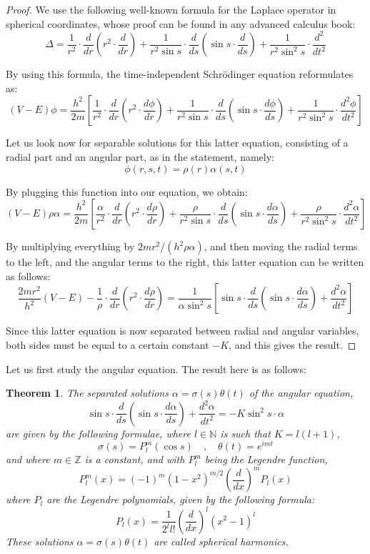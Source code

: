 \documentclass[12pt]{amsbook}
\newtheorem{theorem}{Theorem}[chapter]
\begin{document}
\begin{proof}
We use the following well-known formula for the Laplace operator in spherical coordinates, whose proof can be found in any advanced calculus book:
$$\Delta=\frac{1}{r^2}\cdot\frac{d}{dr}\left(r^2\cdot\frac{d}{dr}\right)
+\frac{1}{r^2\sin s}\cdot\frac{d}{ds}\left(\sin s\cdot\frac{d}{ds}\right)
+\frac{1}{r^2\sin^2s}\cdot\frac{d^2}{dt^2}$$

By using this formula, the time-independent Schr\"odinger equation reformulates as:
$$(V-E)\phi=\frac{h^2}{2m}\left[\frac{1}{r^2}\cdot\frac{d}{dr}\left(r^2\cdot\frac{d\phi}{dr}\right)
+\frac{1}{r^2\sin s}\cdot\frac{d}{ds}\left(\sin s\cdot\frac{d\phi}{ds}\right)
+\frac{1}{r^2\sin^2s}\cdot\frac{d^2\phi}{dt^2}\right]$$

Let us look now for separable solutions for this latter equation, consisting of a radial part and an angular part, as in the statement, namely:
$$\phi(r,s,t)=\rho(r)\alpha(s,t)$$

By plugging this function into our equation, we obtain:
$$(V-E)\rho\alpha=\frac{h^2}{2m}\left[\frac{\alpha}{r^2}\cdot\frac{d}{dr}\left(r^2\cdot\frac{d\rho}{dr}\right)
+\frac{\rho}{r^2\sin s}\cdot\frac{d}{ds}\left(\sin s\cdot\frac{d\alpha}{ds}\right)
+\frac{\rho}{r^2\sin^2s}\cdot\frac{d^2\alpha}{dt^2}\right]$$

By multiplying everything by $2mr^2/(h^2\rho\alpha)$, and then moving the radial terms to the left, and the angular terms to the right, this latter equation can be written as follows:
$$\frac{2mr^2}{h^2}(V-E)-\frac{1}{\rho}\cdot\frac{d}{dr}\left(r^2\cdot\frac{d\rho}{dr}\right)
=\frac{1}{\alpha\sin^2s}\left[\sin s\cdot\frac{d}{ds}\left(\sin s\cdot\frac{d\alpha}{ds}\right)
+\frac{d^2\alpha}{dt^2}\right]$$

Since this latter equation is now separated between radial and angular variables, both sides must be equal to a certain constant $-K$, and this gives the result.
\end{proof}

Let us first study the angular equation. The result here is as follows:

\begin{theorem}
The separated solutions $\alpha=\sigma(s)\theta(t)$ of the angular equation,
$$\sin s\cdot\frac{d}{ds}\left(\sin s\cdot\frac{d\alpha}{ds}\right)
+\frac{d^2\alpha}{dt^2}=-K\sin^2s\cdot\alpha$$
are given by the following formulae, where $l\in\mathbb N$ is such that $K=l(l+1)$,
$$\sigma(s)=P_l^m(\cos s)\quad,\quad\theta(t)=e^{imt}$$
and where $m\in\mathbb Z$ is a constant, and with $P_l^m$ being the Legendre function,
$$P_l^m(x)=(-1)^m(1-x^2)^{m/2}\left(\frac{d}{dx}\right)^mP_l(x)$$
where $P_l$ are the Legendre polynomials, given by the following formula:
$$P_l(x)=\frac{1}{2^ll!}\left(\frac{d}{dx}\right)^l(x^2-1)^l$$
These solutions $\alpha=\sigma(s)\theta(t)$ are called spherical harmonics.
\end{theorem}
\end{document}
